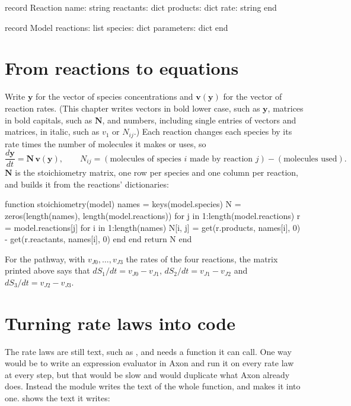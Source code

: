 \documentclass[11pt,a4paper,openany]{report}
\begin{document}
{{\begin{axon}
record Reaction
  name: string
  reactants: dict
  products: dict
  rate: string
end

record Model
  reactions: list
  species: dict
  parameters: dict
end
\end{axon}

\section{From reactions to equations}\label{sec:equations}

Write $\mathbf{y}$ for the vector of species concentrations and $\mathbf{v}(\mathbf{y})$ for the vector of
reaction rates. (This chapter writes vectors in bold lower case, such as
$\mathbf{y}$, matrices in bold capitals, such as $\mathbf{N}$, and numbers,
including single entries of vectors and matrices, in italic, such as $v_1$
or $N_{ij}$.) Each reaction changes each species by its rate times the
number of molecules it makes or uses, so
\[
  \frac{d\mathbf{y}}{dt} = \mathbf{N}\,\mathbf{v}(\mathbf{y}), \qquad
  N_{ij} = (\mbox{molecules of species } i \mbox{ made by reaction } j)
         - (\mbox{molecules used}).
\]
$\mathbf{N}$ is the stoichiometry matrix, one row per species and one column per
reaction, and  builds it from the reactions'
dictionaries:

\begin{axon}
function stoichiometry(model)
  names = keys(model.species)
  N = zeros(length(names), length(model.reactions))
  for j in 1:length(model.reactions)
    r = model.reactions[j]
    for i in 1:length(names)
      N[i, j] = get(r.products, names[i], 0) - get(r.reactants, names[i], 0)
    end
  end
  return N
end
\end{axon}

For the pathway, with $v_{J0}, \ldots, v_{J3}$ the rates of the four
reactions, the matrix printed above says that
$dS_1/dt = v_{J0} - v_{J1}$, $dS_2/dt = v_{J1} - v_{J2}$ and
$dS_3/dt = v_{J2} - v_{J3}$.

\section{Turning rate laws into code}

The rate laws are still text, such as , and
 needs a function it can call. One way would be to write an
expression evaluator in Axon and run it on every rate law at every step,
but that would be slow and would duplicate what Axon already does. Instead
the module writes the text of the whole function, and 
makes it into one.  shows the text it writes:

}}
\end{document}
